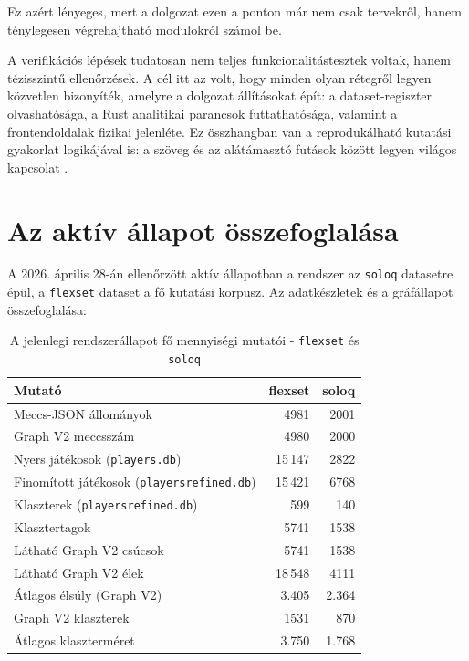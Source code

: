 ﻿\documentclass[a4paper,12pt]{report}
\begin{document}
Ez azért lényeges, mert a dolgozat ezen a ponton már nem csak tervekről, hanem ténylegesen végrehajtható modulokról számol be.

A verifikációs lépések tudatosan nem teljes funkcionalitástesztek voltak, hanem tézisszintű ellenőrzések. A cél itt az volt, hogy minden olyan rétegről legyen közvetlen bizonyíték, amelyre a dolgozat állításokat épít: a dataset-regiszter olvashatósága, a Rust analitikai parancsok futtathatósága, valamint a frontendoldalak fizikai jelenléte. Ez összhangban van a reprodukálható kutatási gyakorlat logikájával is: a szöveg és az alátámasztó futások között legyen világos kapcsolat \cite{sandve2013}.

\section{Az aktív állapot összefoglalása}

A 2026. április 28-án ellenőrzött aktív állapotban a rendszer az \texttt{soloq} datasetre épül, a \texttt{flexset} dataset a fő kutatási korpusz. Az adatkészletek és a gráfállapot összefoglalása:

\begin{table}[H]
\centering
\caption{A jelenlegi rendszerállapot fő mennyiségi mutatói - \texttt{flexset} és \texttt{soloq}}
\begin{tabular}{lrr}
\toprule
\textbf{Mutató} & \textbf{flexset} & \textbf{soloq} \\
\midrule
Meccs-JSON állományok & 4981 & 2001 \\
Graph V2 meccsszám & 4980 & 2000 \\
Nyers játékosok (\texttt{players.db}) & 15\,147 & 2822 \\
Finomított játékosok (\texttt{playersrefined.db}) & 15\,421 & 6768 \\
Klaszterek (\texttt{playersrefined.db}) & 599 & 140 \\
Klasztertagok & 5741 & 1538 \\
Látható Graph V2 csúcsok & 5741 & 1538 \\
Látható Graph V2 élek & 18\,548 & 4111 \\
Átlagos élsúly (Graph V2) & 3.405 & 2.364 \\
Graph V2 klaszterek & 1531 & 870 \\
Átlagos klaszterméret & 3.750 & 1.768 \\
\bottomrule
\end{tabular}
\end{table}
\end{document}
